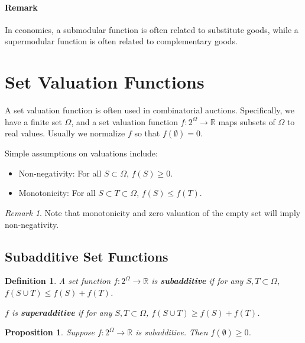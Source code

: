 \documentclass[openany]{book}
\newtheorem{definition}{Definition}[chapter]
\newtheorem{proposition}{Proposition}[chapter]
\theoremstyle{remark}
\newtheorem*{remark}{Remark}
\begin{document}
\paragraph{Remark}
In economics, a submodular function is often related to substitute goods, while a supermodular function is often related to complementary goods.

\section{Set Valuation Functions}
A set valuation function is often used in combinatorial auctions. Specifically, we have a finite set $\Omega$, and a set valuation function $f:2^{\Omega}\to \mathbb{R}$ maps subsets of $\Omega$ to real values. Usually we normalize $f$ so that $f(\emptyset)=0$.

Simple assumptions on valuations include:
\begin{itemize}
    \item Non-negativity: For all $S\subset\Omega$, $f(S)\ge0$.
    \item Monotonicity: For all $S\subset T\subset\Omega$, $f(S)\le f(T)$.
\end{itemize}
\begin{remark}
    Note that monotonicity and zero valuation of the empty set will imply non-negativity.
\end{remark}

\subsection{Subadditive Set Functions}
\begin{definition}
    A set function $f:2^{\Omega}\to \mathbb{R}$ is \textbf{subadditive} if for any $S,T\subset\Omega$, $f(S\cup T)\le f(S)+f(T)$.

    $f$ is \textbf{superadditive} if for any $S,T\subset\Omega$, $f(S\cup T)\ge f(S)+f(T)$.
\end{definition}
\begin{proposition}
    Suppose $f:2^{\Omega}\to \mathbb{R}$ is subadditive. Then $f(\emptyset)\ge0$.
\end{proposition}
\end{document}
